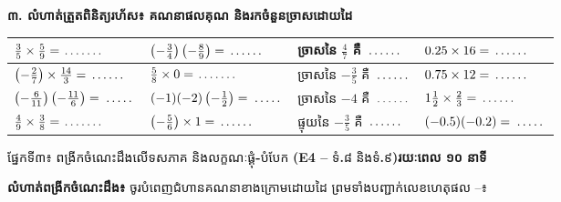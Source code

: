 \documentclass[a4paper,10pt]{article}
\newcommand{\enbf}[1]{{\TimesEn\bfseries #1}}
\newcommand{\cnum}[1]{\mbox{\fontsize{10pt}{12pt}\selectfont\ding{\numexpr181+#1\relax}}}
\newcommand{\blank}[1][1.5cm]{\makebox[#1]{\dotfill}}
\newcommand{\secbar}[2]{%
  \begin{tcolorbox}[enhanced, sharp corners, colback=headgray, colframe=black, boxrule=0.9pt, boxsep=1pt, top=2pt, bottom=2pt, left=5pt, right=5pt, before skip=4pt, after skip=3pt]
    {\muol\fontsize{9.2pt}{13pt}\selectfont #1}\hfill{\fontsize{8pt}{11pt}\selectfont\textbf{#2}}
  \end{tcolorbox}%
}
\begin{document}
\vspace{4pt}
\textbf{៣. លំហាត់ត្រួតពិនិត្យរហ័ស៖ គណនាផលគុណ និងរកចំនួនច្រាសដោយដៃ}

\vspace{2.5pt}
{\renewcommand{\arraystretch}{1.64}
\begin{tabular}{|C{4.40cm}|C{4.40cm}|C{4.40cm}|C{4.40cm}|}
  \hline
  $\frac{3}{5}\times\frac{5}{9} = \blank[1.1cm]$ & $\left(-\frac{3}{4}\right)\left(-\frac{8}{9}\right) = \blank[1.0cm]$ & ច្រាសនៃ $\frac{4}{7}$ គឺ $\blank[1.0cm]$ & $0.25\times 16 = \blank[1.0cm]$ \\
  \hline
  $\left(-\frac{2}{7}\right)\times\frac{14}{3} = \blank[1.0cm]$ & $\frac{5}{8}\times 0 = \blank[1.1cm]$ & ច្រាសនៃ $-\frac{3}{5}$ គឺ $\blank[1.0cm]$ & $0.75\times 12 = \blank[1.0cm]$ \\
  \hline
  $\left(-\frac{6}{11}\right)\left(-\frac{11}{6}\right) = \blank[0.9cm]$ & $(-1)(-2)\left(-\frac{1}{2}\right) = \blank[0.9cm]$ & ច្រាសនៃ $-4$ គឺ $\blank[1.0cm]$ & $1\frac{1}{2}\times\frac{2}{3} = \blank[1.0cm]$ \\
  \hline
  $\frac{4}{9}\times\frac{3}{8} = \blank[1.1cm]$ & $\left(-\frac{5}{6}\right)\times 1 = \blank[1.0cm]$ & ផ្ទុយនៃ $-\frac{3}{5}$ គឺ $\blank[1.0cm]$ & $(-0.5)(-0.2) = \blank[0.9cm]$ \\
  \hline
\end{tabular}}

\newpage

\secbar{ផ្នែកទី៣៖ ពង្រីកចំណេះដឹងលើទសភាគ និងលក្ខណៈផ្គុំ\enbf{-}បំបែក \enbf{(E4 --} ទំ\enbf{.}៨ និងទំ\enbf{.}៩\enbf{)}}{រយៈពេល ១០ នាទី}

\textbf{លំហាត់ពង្រីកចំណេះដឹង៖} ចូរបំពេញជំហានគណនាខាងក្រោមដោយដៃ ព្រមទាំងបញ្ជាក់លេខហេតុផល \cnum{1}--\cnum{5}៖
\end{document}
